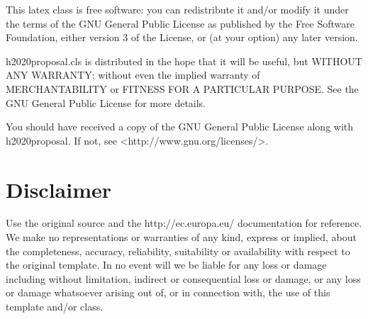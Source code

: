\documentclass[pdftext]{article}
\begin{document}
 This latex class is free software: you can redistribute it and/or modify
 it under the terms of the GNU General Public License as published by
 the Free Software Foundation, either version 3 of the License, or
 (at your option) any later version.

 h2020proposal.cls is distributed in the hope that it will be useful,
 but WITHOUT ANY WARRANTY; without even the implied warranty of
 MERCHANTABILITY or FITNESS FOR A PARTICULAR PURPOSE.  See the
 GNU General Public License for more details.

 You should have received a copy of the GNU General Public License
 along with h2020proposal.  If not, see <http://www.gnu.org/licenses/>.

\section*{Disclaimer}
\label{sec:disclaimer}
Use the original source and the http://ec.europa.eu/ documentation for reference. We make no representations or warranties of any kind, express or implied, about the completeness, accuracy, reliability, suitability or availability with respect to the original template. In no event will we be liable for any loss or damage including without limitation, indirect or consequential loss or damage, or any loss or damage whatsoever arising out of, or in connection with, the use of this template and/or class.
\end{document}
